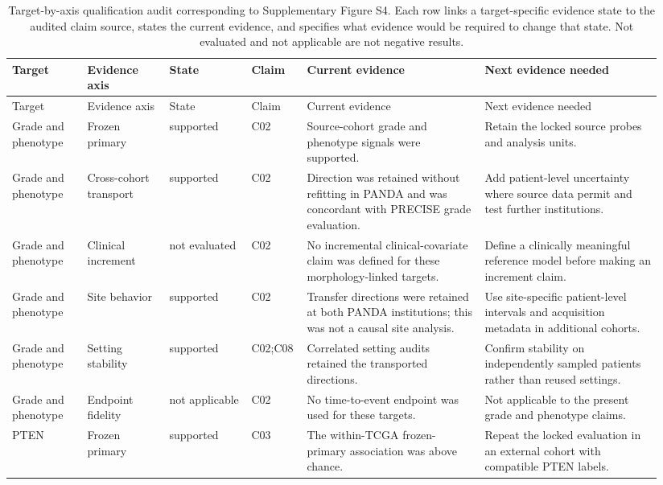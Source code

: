 \begin{landscape}
\begingroup
\fontsize{9.5pt}{11pt}\selectfont
\setlength{\tabcolsep}{3pt}
\begin{longtable}{@{}p{0.11\linewidth}p{0.12\linewidth}p{0.12\linewidth}p{0.07\linewidth}p{0.26\linewidth}p{0.26\linewidth}@{}}
\caption{Target-by-axis qualification audit corresponding to Supplementary Figure S4. Each row links a target-specific evidence state to the audited claim source, states the current evidence, and specifies what evidence would be required to change that state. Not evaluated and not applicable are not negative results.}
\label{tab:supp-evidence-axis-audit}\\
\toprule
Target & Evidence axis & State & Claim & Current evidence & Next evidence needed \\
\midrule
\endfirsthead
\toprule
Target & Evidence axis & State & Claim & Current evidence & Next evidence needed \\
\midrule
\endhead
Grade and phenotype & Frozen primary & supported & C02 & Source-cohort grade and phenotype signals were supported. & Retain the locked source probes and analysis units. \\
Grade and phenotype & Cross-cohort transport & supported & C02 & Direction was retained without refitting in PANDA and was concordant with PRECISE grade evaluation. & Add patient-level uncertainty where source data permit and test further institutions. \\
Grade and phenotype & Clinical increment & not evaluated & C02 & No incremental clinical-covariate claim was defined for these morphology-linked targets. & Define a clinically meaningful reference model before making an increment claim. \\
Grade and phenotype & Site behavior & supported & C02 & Transfer directions were retained at both PANDA institutions; this was not a causal site analysis. & Use site-specific patient-level intervals and acquisition metadata in additional cohorts. \\
Grade and phenotype & Setting stability & supported & C02;C08 & Correlated setting audits retained the transported directions. & Confirm stability on independently sampled patients rather than reused settings. \\
Grade and phenotype & Endpoint fidelity & not applicable & C02 & No time-to-event endpoint was used for these targets. & Not applicable to the present grade and phenotype claims. \\
PTEN & Frozen primary & supported & C03 & The within-TCGA frozen-primary association was above chance. & Repeat the locked evaluation in an external cohort with compatible PTEN labels. \\

\end{longtable}
\end{landscape}
